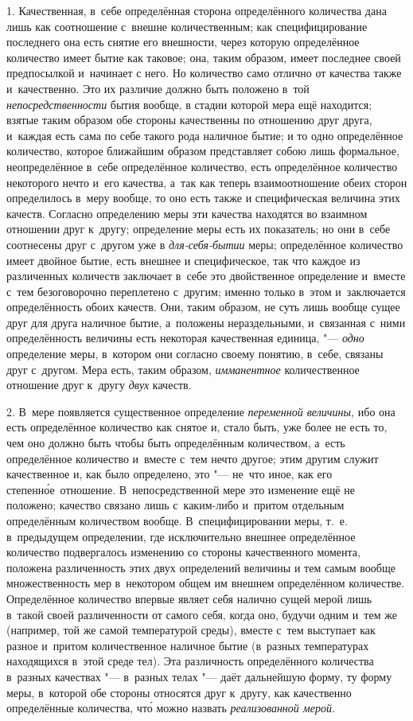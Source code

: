 1. Качественная, в~себе определённая сторона определённого количества дана лишь
как соотношение с~внешне количественным; как специфицирование последнего она
есть снятие его внешности, через которую определённое количество имеет бытие
как таковое; она, таким образом, имеет последнее своей предпосылкой и~начинает
с него. Но количество само отлично от качества также и~качественно. Это их
различие должно быть положено в~той {\em непосредственности} бытия вообще, в
стадии которой мера ещё находится; взятые таким образом обе стороны качественны
по отношению друг друга, и~каждая есть сама по себе такого рода наличное бытие;
и то одно определённое количество, которое ближайшим образом представляет собою
лишь формальное, неопределённое в~себе определённое количество, есть
определённое количество некоторого нечто и~его качества, а~так как теперь
взаимоотношение обеих сторон определилось в~меру вообще, то оно есть также и
специфическая величина этих качеств. Согласно определению меры эти качества
находятся во взаимном отношении друг к~другу; определение меры есть их
показатель; но они в~себе соотнесены друг с~другом уже в {\em для-себя-бытии}
меры; определённое количество имеет двойное бытие, есть внешнее и
специфическое, так что каждое из различенных количеств заключает в~себе это
двойственное определение и~вместе с~тем безоговорочно переплетено с~другим;
именно только в~этом и~заключается определённость обоих качеств. Они, таким
образом, не суть лишь вообще сущее друг для друга наличное бытие, а~положены
нераздельными, и~связанная с~ними определённость величины есть некоторая
качественная единица, "--- {\em одно} определение меры, в~котором они согласно
своему понятию, в~себе, связаны друг с~другом. Мера есть, таким образом,
{\em имманентное} количественное отношение друг к~другу {\em двух} качеств.

2. В~мере появляется существенное определение {\em переменной величины,} ибо
она есть определённое количество как снятое и, стало быть, уже более не есть
то, чем оно должно быть чтобы быть определённым количеством, а~есть
определённое количество и~вместе с~тем нечто другое; этим другим служит
качественное и, как было определено, это "--- не~что иное, как его
степенн\'{о}е~отношение. В~непосредственной мере это изменение ещё не положено;
качество связано лишь с~каким-либо и~притом отдельным определённым количеством
вообще. В~специфицировании меры, т.~е. в~предыдущем определении, где
исключительно внешнее определённое количество подвергалось изменению со стороны
качественного момента, положена различенность этих двух определений величины и
тем самым вообще множественность мер в~некотором общем им внешнем определённом
количестве. Определённое количество впервые являет себя налично сущей мерой
лишь в~такой своей различенности от самого себя, когда оно, будучи одним и~тем
же (например, той же самой температурой среды), вместе с~тем выступает как
разное и~притом количественное наличное бытие (в~разных температурах
находящихся в~этой среде тел). Эта различность определённого количества
в~разных качествах "--- в~разных телах "--- даёт дальнейшую форму, ту форму
меры, в~которой обе стороны относятся друг к~другу, как качественно
определённые количества, чт\'{о} можно назвать {\em реализованной мерой}.

